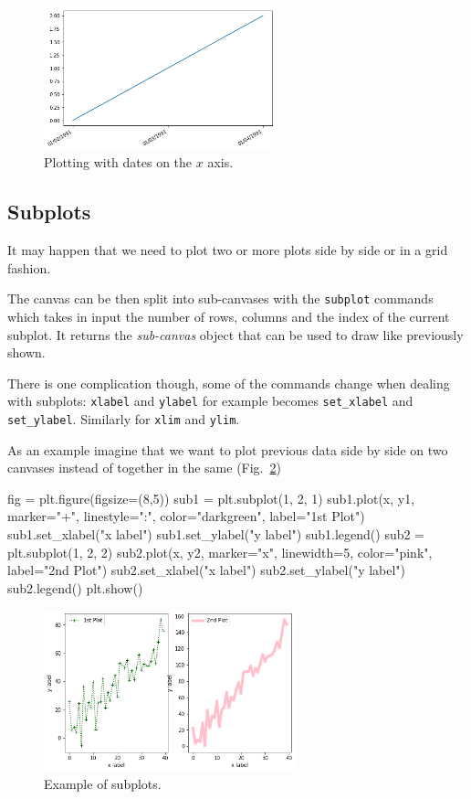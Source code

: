 \begin{figure}[h]
	\centering
	\includegraphics[width=0.6\textwidth]{figures/axis3}
	\caption{Plotting with dates on the $x$ axis.}
	\label{fig:axis3}
\end{figure}

\subsection{Subplots}
\label{subplots}

It may happen that we need to plot two or more plots side by side or in a grid fashion.

The canvas can be then split into sub-canvases with the  \texttt{subplot} commands which takes in input the number of rows, columns and the index of the current subplot. It returns the \emph{sub-canvas} object that can be used to draw like previously shown.

There is one complication though, some of the commands change when
dealing with subplots: \texttt{xlabel} and \texttt{ylabel} for example becomes \texttt{set\_xlabel} and \texttt{set\_ylabel}. Similarly for \texttt{xlim} and \texttt{ylim}.

As an example imagine that we want to plot previous data side by side on two canvases instead of together in the same (Fig.~\ref{fig:subplot})

\begin{ipython}
fig = plt.figure(figsize=(8,5))
sub1 = plt.subplot(1, 2, 1)
sub1.plot(x, y1, marker="+", linestyle=":", color="darkgreen", label="1st Plot")
sub1.set_xlabel("x label")
sub1.set_ylabel("y label")
sub1.legend()
sub2 = plt.subplot(1, 2, 2)
sub2.plot(x, y2, marker="x", linewidth=5, color="pink", label="2nd Plot")
sub2.set_xlabel("x label")
sub2.set_ylabel("y label")
sub2.legend()
plt.show()
\end{ipython}

\begin{figure} [htb]
	\centering
	\includegraphics[width=0.65\textwidth]{figures/subplot}
	\caption{Example of subplots.}
	\label{fig:subplot}
\end{figure}

